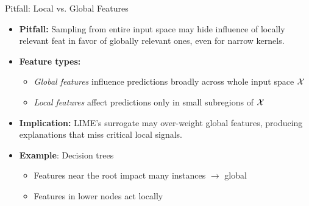 \documentclass[10pt,compress,t,notes=noshow, xcolor=table]{beamer}
\begin{document}
\begin{frame}{Pitfall: Local vs. Global Features }

\begin{itemize}%
	\item<1-> \textbf{Pitfall:} Sampling from entire input space may hide influence of locally relevant feat in favor of globally relevant ones, even for narrow kernels.
 \item<1-> \textbf{Feature types:}
  \begin{itemize}
    \item \emph{Global features} influence predictions broadly across whole input space $\mathcal{X}$
    \item \emph{Local features} affect predictions only in small subregions of $\mathcal{X}$
  \end{itemize}
  
  \item<2-> \textbf{Implication:} LIME’s surrogate may over-weight global features, producing explanations that miss critical local signals.
	\item<3-> \textbf{Example}: Decision trees
    \begin{itemize}
        \item Features near the root impact many instances $\rightarrow$ global
        \item Features in lower nodes act locally
    \end{itemize}
\end{itemize}

\end{frame}
\end{document}
